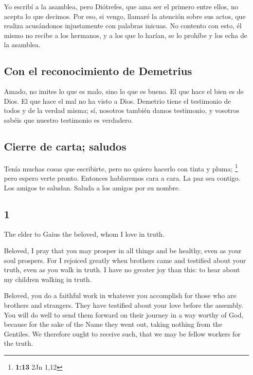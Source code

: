 \begin{paracol}{2}
 Yo escribí a la asamblea, pero Diótrefes, que ama ser el
primero entre ellos, no acepta lo que decimos.  Por eso,
si vengo, llamaré la atención sobre sus actos, que realiza acusándonos
injustamente con palabras inicuas. No contento con esto, él mismo no
recibe a los hermanos, y a los que lo harían, se lo prohíbe y los echa
de la asamblea.

\hypertarget{con-el-reconocimiento-de-demetrius}{%
\subsection{Con el reconocimiento de
Demetrius}\label{con-el-reconocimiento-de-demetrius}}

 Amado, no imites lo que es malo, sino lo que es bueno.
El que hace el bien es de Dios. El que hace el mal no ha visto a Dios.
 Demetrio tiene el testimonio de todos y de la verdad
misma; sí, nosotros también damos testimonio, y vosotros sabéis que
nuestro testimonio es verdadero.

\hypertarget{cierre-de-carta-saludos}{%
\subsection{Cierre de carta; saludos}\label{cierre-de-carta-saludos}}

 Tenía muchas cosas que escribirte, pero no quiero
hacerlo con tinta y pluma; \footnote{\textbf{1:13} 2Jn 1,12}
 pero espero verte pronto. Entonces hablaremos cara a
cara. La paz sea contigo. Los amigos te saludan. Saluda a los amigos por
su nombre. \switchcolumn \begin{otherlanguage}{english}

\hypertarget{section-1}{%
\section{1}\label{section-1}}

 The elder to Gaius the beloved, whom I love in truth.

 Beloved, I pray that you may prosper in all things and be
healthy, even as your soul prospers.  For I rejoiced
greatly when brothers came and testified about your truth, even as you
walk in truth.  I have no greater joy than this: to hear
about my children walking in truth.

 Beloved, you do a faithful work in whatever you
accomplish for those who are brothers and strangers.  They
have testified about your love before the assembly. You will do well to
send them forward on their journey in a way worthy of God,
 because for the sake of the Name they went out, taking
nothing from the Gentiles.  We therefore ought to receive
such, that we may be fellow workers for the truth.


\end{otherlanguage}
\end{paracol}
